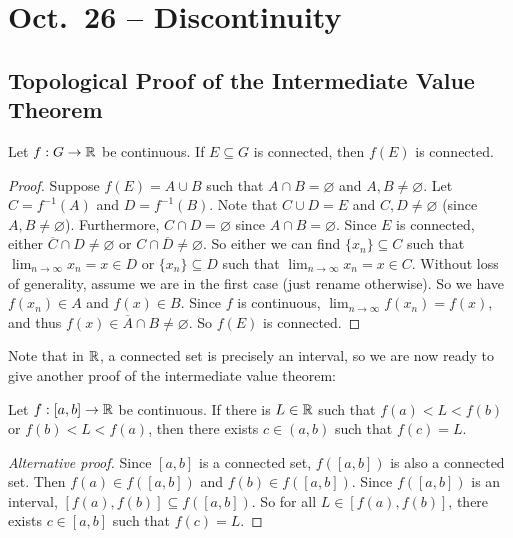 \chapter{Oct.~26 -- Discontinuity}

\section{Topological Proof of the Intermediate Value Theorem}

\begin{theorem}
  Let $f : G \to \mathbb{R}$ be continuous. If $E \subseteq G$
  is connected, then $f(E)$ is connected.
\end{theorem}

\begin{proof}
  Suppose $f(E) = A \cup B$ such that
  $A \cap B = \varnothing$ and $A, B \ne \varnothing$.
  Let $C = f^{-1}(A)$ and $D = f^{-1}(B)$.
  Note that $C \cup D = E$ and $C, D \ne \varnothing$
  (since $A, B \ne \varnothing$). Furthermore,
  $C \cap D = \varnothing$ since $A \cap B = \varnothing$.
  Since $E$ is connected, either
  $\overline{C} \cap D \ne \varnothing$
  or $C \cap \overline{D} \ne \varnothing$.
  So either we can find
  $\{x_n\} \subseteq C$ such that
  $\lim_{n \to \infty} x_n = x \in D$ or
  $\{x_n\} \subseteq D$ such that
  $\lim_{n \to \infty} x_n = x \in C$.
  Without loss of generality, assume we are in the first
  case (just rename otherwise).
  So we have $f(x_n) \in A$ and
  $f(x) \in B$. Since $f$ is continuous,
  $\lim_{n \to \infty} f(x_n) = f(x)$, and
  thus
  $f(x) \in \overline{A} \cap B \ne \varnothing$.
  So $f(E)$ is connected.
\end{proof}

Note that in $\mathbb{R}$, a connected set is precisely
an interval,
so we are now ready to give another proof of the
intermediate value theorem:
\begin{theorem}
  Let $f : [a, b] \to \mathbb{R}$ be continuous. If there is
  $L \in \mathbb{R}$
  such that $f(a) < L < f(b)$ or $f(b) < L < f(a)$,
  then there exists $c \in (a, b)$ such that $f(c) = L$.
\end{theorem}

\begin{proof}[Alternative proof]
  Since $[a, b]$ is a connected set, $f([a, b])$ is
  also a connected set. Then
  $f(a) \in f([a, b])$ and $f(b) \in f([a, b])$.
  Since $f([a, b])$ is an interval,
  $[f(a), f(b)] \subseteq f([a, b])$. So for all
  $L \in [f(a), f(b)]$, there exists $c \in [a, b]$
  such that $f(c) = L$.
\end{proof}

